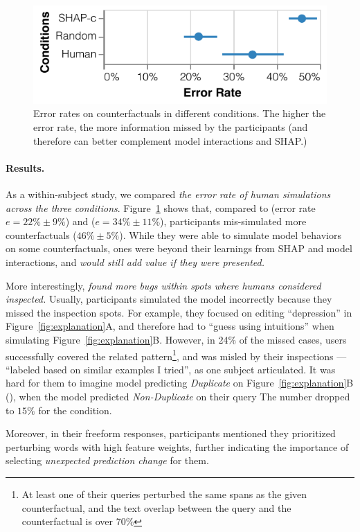 \begin{figure}[t]
\centering
\includegraphics[width=1\columnwidth]{figures/err_rate}
\vspace{-15pt}
\caption{
Error rates on counterfactuals in different conditions. The higher the error rate, the more information missed by the participants (\ie and therefore can better complement model interactions and SHAP.)
}
\vspace{-10pt}
\label{fig:err_rate}
\end{figure}

\paragraph{Results.}
As a within-subject study, we compared \emph{the error rate of human simulations across the three conditions}.
Figure~\ref{fig:err_rate} shows that, compared to \crandom (error rate $e=22\%\pm9\%$) and \chuman ($e=34\%\pm11\%$), participants mis-simulated more \cshap counterfactuals ($46\%\pm 5\%$).
While they were able to simulate model behaviors on some counterfactuals, \cshap ones were beyond their learnings from SHAP and model interactions, and \emph{would still add value if they were presented.}


More interestingly, \emph{\cshap found more bugs within spots where humans considered inspected.}
Usually, participants simulated the model incorrectly because they missed the inspection spots.
For example, they focused on editing ``depression'' in Figure~\ref{fig:explanation}A, and therefore had to ``guess using intuitions'' when simulating Figure~\ref{fig:explanation}B.
However, in 24\% of the missed \cshap cases, users successfully covered the related pattern\footnote{At least one of their queries perturbed the same spans as the given counterfactual, and the text overlap between the query and the counterfactual is over 70\%}, and was misled by their inspections --- ``labeled based on similar examples I tried'', as one subject articulated.
It was hard for them to imagine model predicting \emph{Duplicate} on Figure~\ref{fig:explanation}B (), when the model predicted \emph{Non-Duplicate} on their query 
The number dropped to $15\%$ for the \chuman condition.


Moreover, in their freeform responses,  participants mentioned they prioritized perturbing words with high feature weights, further indicating the importance of selecting \emph{unexpected prediction change} for them.


